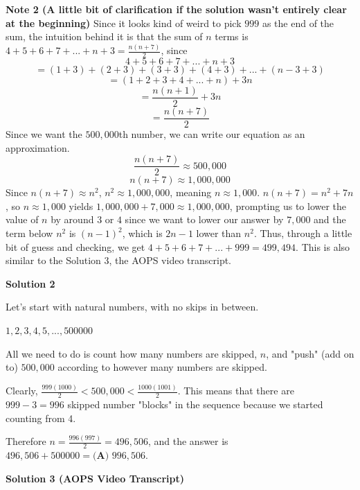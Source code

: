 \begin{enumerate}
 \textbf{Note 2 (A little bit of clarification if the solution wasn't entirely clear at the beginning)} Since it looks kind of weird to pick $999$ as the end of the sum, the intuition behind it is that the sum of $n$ terms is $4+5+6+7+...+n+3=\frac{n(n+7)}{2}$, since 
 \[4+5+6+7+...+n+3\] 
 \[=(1+3)+(2+3)+(3+3)+(4+3)+...+(n-3+3)\] 
 \[=(1+2+3+4+...+n)+3n\] 
 \[=\frac{n(n+1)}{2}+3n\] 
 \[=\frac{n(n+7)}{2}\]Since we want the $500,000$th number, we can write our equation as an approximation. 
 \[\frac{n(n+7)}{2} \approx 500,000\] 
 \[n(n+7) \approx 1,000,000\]Since $n(n+7) \approx n^2$, $n^2 \approx 1,000,000$, meaning $n \approx 1,000$. $n(n+7)=n^2+7n$, so $n \approx 1,000$ yields $1,000,000+7,000 \approx 1,000,000$, prompting us to lower the value of $n$ by around $3$ or $4$ since we want to lower our answer by $7,000$ and the term below $n^2$ is $(n-1)^2$, which is $2n-1$ lower than $n^2$. Thus, through a little bit of guess and checking, we get $4+5+6+7+...+999=499,494.$ This is also similar to the Solution 3, the AOPS video transcript.

 



\textbf{Solution 2}

Let's start with natural numbers, with no skips in between.

 $1,2,3,4,5,...,500000$

 All we need to do is count how many numbers are skipped, $n$, and "push" (add on to) $500,000$ according to however many numbers are skipped.

 Clearly, $\frac{999(1000)}{2}<500,000<\frac{1000(1001)}{2}$. This means that there are $999-3=996$ skipped number "blocks" in the sequence because we started counting from 4.

 Therefore $n=\frac{996(997)}{2}=496,506$, and the answer is $496,506+500000=\boxed{\textbf{(A) }996,506}$.

 



\textbf{Solution 3 (AOPS Video Transcript)}


\end{enumerate}
